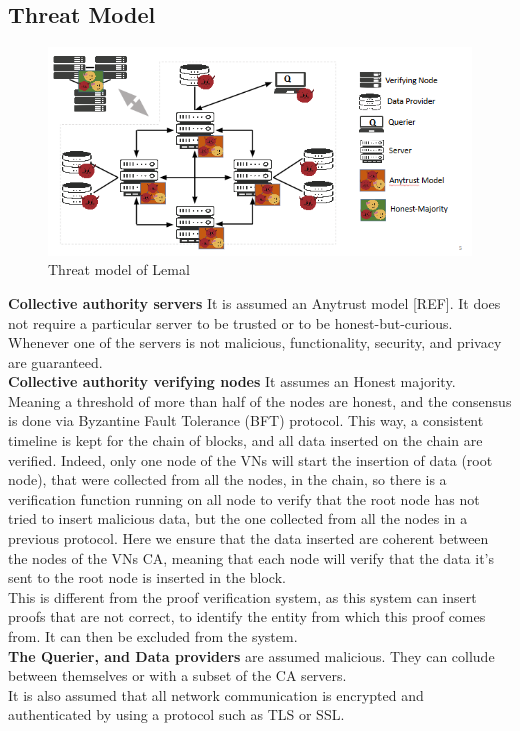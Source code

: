 \documentclass{article}
\begin{document}
\subsection{Threat Model}
\begin{figure}[H]
\center
\includegraphics[scale=0.75]{img/threatLemal.png}
\caption{Threat model of Lemal}
\end{figure}
\textbf{Collective authority servers} It is assumed an Anytrust model [REF]. It does not require a particular server to be trusted or to be honest-but-curious. Whenever one of the servers is not malicious, functionality, security, and privacy are guaranteed.\\
\textbf{Collective authority verifying nodes} It assumes an Honest majority. Meaning a threshold of more than half of the nodes are honest, and the consensus is done via Byzantine Fault Tolerance (BFT) protocol. This way, a consistent timeline is kept for the chain of blocks, and all data inserted on the chain are verified. Indeed, only one node of the VNs will start the insertion of data (root node), that were collected from all the nodes, in the chain, so there is a verification function running on all node to verify that the root node has not tried to insert malicious data, but the one collected from all the nodes in a previous protocol.
Here we ensure that the data inserted are coherent between the nodes of the VNs CA, meaning that each node will verify that the data it's sent to the root node is inserted in the block.\\
This is different from the proof verification system, as this system can insert proofs that are not correct, to identify the entity from which this proof comes from. It can then be excluded from the system.\\
\textbf{The Querier, and Data providers} are assumed malicious. They can collude between themselves or with a subset of the CA servers.\\
It is also assumed that all network communication is encrypted and authenticated by using a protocol such as TLS or SSL.
\end{document}
